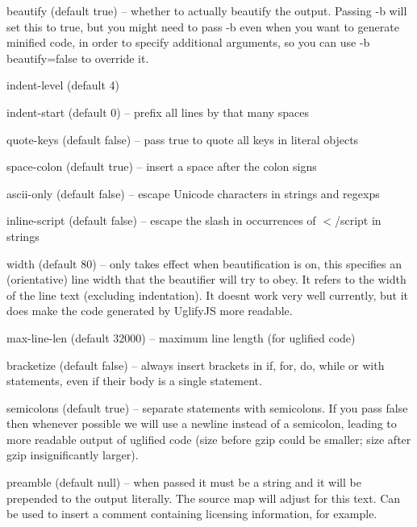\begin{DoxyItemize}
\item {\ttfamily beautify} (default {\ttfamily true}) -- whether to actually beautify the output. Passing {\ttfamily -\/b} will set this to true, but you might need to pass {\ttfamily -\/b} even when you want to generate minified code, in order to specify additional arguments, so you can use {\ttfamily -\/b beautify=false} to override it.
\item {\ttfamily indent-\/level} (default 4)
\item {\ttfamily indent-\/start} (default 0) -- prefix all lines by that many spaces
\item {\ttfamily quote-\/keys} (default {\ttfamily false}) -- pass {\ttfamily true} to quote all keys in literal objects
\item {\ttfamily space-\/colon} (default {\ttfamily true}) -- insert a space after the colon signs
\item {\ttfamily ascii-\/only} (default {\ttfamily false}) -- escape Unicode characters in strings and regexps
\item {\ttfamily inline-\/script} (default {\ttfamily false}) -- escape the slash in occurrences of {\ttfamily $<$/script} in strings
\item {\ttfamily width} (default 80) -- only takes effect when beautification is on, this specifies an (orientative) line width that the beautifier will try to obey. It refers to the width of the line text (excluding indentation). It doesn\textquotesingle{}t work very well currently, but it does make the code generated by Uglify\+J\+S more readable.
\item {\ttfamily max-\/line-\/len} (default 32000) -- maximum line length (for uglified code)
\item {\ttfamily bracketize} (default {\ttfamily false}) -- always insert brackets in {\ttfamily if}, {\ttfamily for}, {\ttfamily do}, {\ttfamily while} or {\ttfamily with} statements, even if their body is a single statement.
\item {\ttfamily semicolons} (default {\ttfamily true}) -- separate statements with semicolons. If you pass {\ttfamily false} then whenever possible we will use a newline instead of a semicolon, leading to more readable output of uglified code (size before gzip could be smaller; size after gzip insignificantly larger).
\item {\ttfamily preamble} (default {\ttfamily null}) -- when passed it must be a string and it will be prepended to the output literally. The source map will adjust for this text. Can be used to insert a comment containing licensing information, for example.

\end{DoxyItemize}
